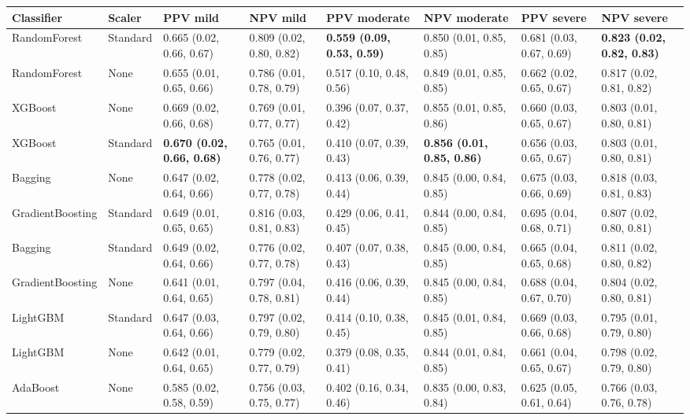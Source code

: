 \begin{tabular}{llllllll}
\toprule
Classifier & Scaler & PPV mild & NPV mild & PPV moderate & NPV moderate & PPV severe & NPV severe \\
\midrule
RandomForest & Standard & 0.665 (0.02, 0.66, 0.67) & 0.809 (0.02, 0.80, 0.82) & \textbf{0.559 (0.09, 0.53, 0.59)} & 0.850 (0.01, 0.85, 0.85) & 0.681 (0.03, 0.67, 0.69) & \textbf{0.823 (0.02, 0.82, 0.83)} \\
RandomForest & None & 0.655 (0.01, 0.65, 0.66) & 0.786 (0.01, 0.78, 0.79) & 0.517 (0.10, 0.48, 0.56) & 0.849 (0.01, 0.85, 0.85) & 0.662 (0.02, 0.65, 0.67) & 0.817 (0.02, 0.81, 0.82) \\
XGBoost & None & 0.669 (0.02, 0.66, 0.68) & 0.769 (0.01, 0.77, 0.77) & 0.396 (0.07, 0.37, 0.42) & 0.855 (0.01, 0.85, 0.86) & 0.660 (0.03, 0.65, 0.67) & 0.803 (0.01, 0.80, 0.81) \\
XGBoost & Standard & \textbf{0.670 (0.02, 0.66, 0.68)} & 0.765 (0.01, 0.76, 0.77) & 0.410 (0.07, 0.39, 0.43) & \textbf{0.856 (0.01, 0.85, 0.86)} & 0.656 (0.03, 0.65, 0.67) & 0.803 (0.01, 0.80, 0.81) \\
Bagging & None & 0.647 (0.02, 0.64, 0.66) & 0.778 (0.02, 0.77, 0.78) & 0.413 (0.06, 0.39, 0.44) & 0.845 (0.00, 0.84, 0.85) & 0.675 (0.03, 0.66, 0.69) & 0.818 (0.03, 0.81, 0.83) \\
GradientBoosting & Standard & 0.649 (0.01, 0.65, 0.65) & 0.816 (0.03, 0.81, 0.83) & 0.429 (0.06, 0.41, 0.45) & 0.844 (0.00, 0.84, 0.85) & 0.695 (0.04, 0.68, 0.71) & 0.807 (0.02, 0.80, 0.81) \\
Bagging & Standard & 0.649 (0.02, 0.64, 0.66) & 0.776 (0.02, 0.77, 0.78) & 0.407 (0.07, 0.38, 0.43) & 0.845 (0.00, 0.84, 0.85) & 0.665 (0.04, 0.65, 0.68) & 0.811 (0.02, 0.80, 0.82) \\
GradientBoosting & None & 0.641 (0.01, 0.64, 0.65) & 0.797 (0.04, 0.78, 0.81) & 0.416 (0.06, 0.39, 0.44) & 0.845 (0.00, 0.84, 0.85) & 0.688 (0.04, 0.67, 0.70) & 0.804 (0.02, 0.80, 0.81) \\
LightGBM & Standard & 0.647 (0.03, 0.64, 0.66) & 0.797 (0.02, 0.79, 0.80) & 0.414 (0.10, 0.38, 0.45) & 0.845 (0.01, 0.84, 0.85) & 0.669 (0.03, 0.66, 0.68) & 0.795 (0.01, 0.79, 0.80) \\
LightGBM & None & 0.642 (0.01, 0.64, 0.65) & 0.779 (0.02, 0.77, 0.79) & 0.379 (0.08, 0.35, 0.41) & 0.844 (0.01, 0.84, 0.85) & 0.661 (0.04, 0.65, 0.67) & 0.798 (0.02, 0.79, 0.80) \\
AdaBoost & None & 0.585 (0.02, 0.58, 0.59) & 0.756 (0.03, 0.75, 0.77) & 0.402 (0.16, 0.34, 0.46) & 0.835 (0.00, 0.83, 0.84) & 0.625 (0.05, 0.61, 0.64) & 0.766 (0.03, 0.76, 0.78) \\

\end{tabular}
